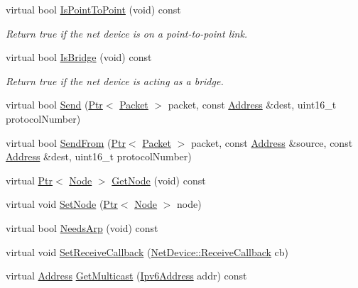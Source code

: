 \begin{DoxyCompactItemize}
virtual bool \hyperlink{classns3_1_1PointToPointNetDevice_a9ce24ac8d34137b1ca90b2c7126aed2c}{Is\+Point\+To\+Point} (void) const 
\begin{DoxyCompactList}\small\item\em Return true if the net device is on a point-\/to-\/point link. \end{DoxyCompactList}\item 
virtual bool \hyperlink{classns3_1_1PointToPointNetDevice_af920499cb53d6cdd798fadf946d33f45}{Is\+Bridge} (void) const 
\begin{DoxyCompactList}\small\item\em Return true if the net device is acting as a bridge. \end{DoxyCompactList}\item 
virtual bool \hyperlink{classns3_1_1PointToPointNetDevice_ad084e76d4a07b0818f1de9d188aa447e}{Send} (\hyperlink{classns3_1_1Ptr}{Ptr}$<$ \hyperlink{classns3_1_1Packet}{Packet} $>$ packet, const \hyperlink{classns3_1_1Address}{Address} \&dest, uint16\+\_\+t protocol\+Number)
\item 
virtual bool \hyperlink{classns3_1_1PointToPointNetDevice_a044d217b6869eff70e35644954e4a041}{Send\+From} (\hyperlink{classns3_1_1Ptr}{Ptr}$<$ \hyperlink{classns3_1_1Packet}{Packet} $>$ packet, const \hyperlink{classns3_1_1Address}{Address} \&source, const \hyperlink{classns3_1_1Address}{Address} \&dest, uint16\+\_\+t protocol\+Number)
\item 
virtual \hyperlink{classns3_1_1Ptr}{Ptr}$<$ \hyperlink{classns3_1_1Node}{Node} $>$ \hyperlink{classns3_1_1PointToPointNetDevice_aa5c45279eb6a9f0bc5347059220a842f}{Get\+Node} (void) const 
\item 
virtual void \hyperlink{classns3_1_1PointToPointNetDevice_ad832f1923fedc6741cf8d33bfb4dcb09}{Set\+Node} (\hyperlink{classns3_1_1Ptr}{Ptr}$<$ \hyperlink{classns3_1_1Node}{Node} $>$ node)
\item 
virtual bool \hyperlink{classns3_1_1PointToPointNetDevice_aa0fefd6d3cf0a1a0fd5fe5a0d12c8947}{Needs\+Arp} (void) const 
\item 
virtual void \hyperlink{classns3_1_1PointToPointNetDevice_aa532a4641f40d40d04c49710edaf6ed9}{Set\+Receive\+Callback} (\hyperlink{classns3_1_1NetDevice_ad5e5e1ca187472bc2ba99575d8def568}{Net\+Device\+::\+Receive\+Callback} cb)
\item 
virtual \hyperlink{classns3_1_1Address}{Address} \hyperlink{classns3_1_1PointToPointNetDevice_a0a85684446e32ff38014de0f6e9026cc}{Get\+Multicast} (\hyperlink{classns3_1_1Ipv6Address}{Ipv6\+Address} addr) const 

\end{DoxyCompactItemize}

